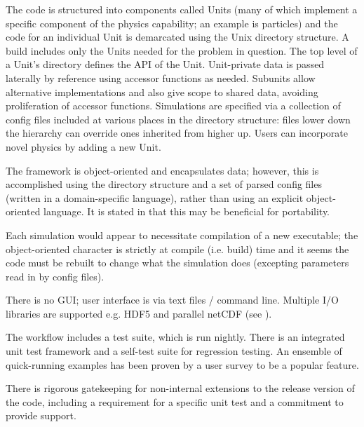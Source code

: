 The code is structured into components called Units (many of which implement a 
specific component of the physics capability; an example is particles) and the 
code for an individual Unit is demarcated using the Unix directory structure.  
A build includes only the Units needed for the problem in question.  The top 
level of a Unit's directory defines the API of the Unit.  Unit-private data is 
passed laterally by reference using accessor functions as needed.  Subunits 
allow alternative implementations and also give scope to shared data, avoiding 
proliferation of accessor functions.  Simulations are specified via a 
collection of config files included at various places in the directory 
structure: files lower down the hierarchy can override ones inherited from 
higher up.  Users can incorporate novel physics by adding a new Unit.  

The framework is object-oriented and encapsulates data; however, this is 
accomplished using the directory structure and a set of parsed config files 
(written in a domain-specific language), rather than using an explicit 
object-oriented language.  It is stated in \cite{Du09Exte} that this may be 
beneficial for portability.

Each simulation would appear to necessitate compilation of a new executable; 
the object-oriented character is strictly at compile (i.e. build) time and it 
seems the code must be rebuilt to change what the simulation does (excepting 
parameters read in by config files).

There is no GUI; user interface is via text files / command line.  Multiple I/O 
libraries are supported e.g. HDF5 and parallel netCDF (see \cite{Du09Exte}).

The workflow includes a test suite, which is run nightly.
There is an integrated unit test framework and a self-test suite for regression testing.  
An ensemble of quick-running examples has been proven by a user survey to be a popular feature.  

There is rigorous gatekeeping for non-internal extensions to the release version of the code, 
including a requirement for a specific unit test and a commitment to provide support.


